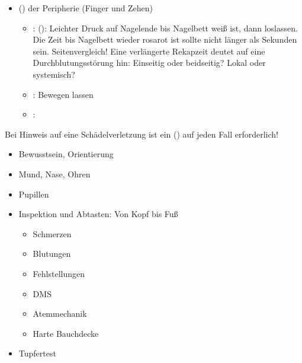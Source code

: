 {\begin{itemize}
\begin{itemize}
    \item {}: Schultern, Arme, Hände
    \item {}: vorne und seitlich 
    (Prellmarken?
    Atemmechanik? 
    Hautemphysem? 
    Gegen leichten Druck einatmen lassen)
    \item {}: in 4 Quadranten (Prellmarken?
    Abwehrspannung/harte Bauchdecke?),
    \item {}: von der Seite andrücken, schmerzhaft?
    \item {}:  Tast-, Klopfschmerz?
    
    \item {}: 
    Beine (sichtbare Verletzungen?), 
    Füße (Schuhe und Socken ausziehen)
  \end{itemize}
  \item {} () der Peripherie (Finger und Zehen) \label{topic:dms}
  \begin{itemize}
    \item {}: 
     ():
    Leichter Druck auf Nagelende bis Nagelbett weiß ist,
    dann loslassen. 
    Die Zeit bis Nagelbett wieder rosarot ist sollte
    nicht länger als  Sekunden sein.
    Seitenvergleich! 
    Eine verlängerte Rekapzeit deutet auf
    eine Durchblutungsstörung hin: 
    Einseitig oder beidseitig? 
    Lokal oder systemisch?
    \item {}: Bewegen lassen
    \item {}: 
  \end{itemize}
\end{itemize}
Bei Hinweis auf eine Schädelverletzung ist ein
 () auf jeden
Fall erforderlich! 
}{%
\begin{itemize}
  \item Bewusstsein, Orientierung
  \item Mund, Nase, Ohren
  \item Pupillen
  \item Inspektion und Abtasten: Von Kopf bis Fuß
  \begin{itemize}
    \item Schmerzen
    \item Blutungen
    \item Fehlstellungen
    \item DMS
    \item Atemmechanik
    \item Harte Bauchdecke
  \end{itemize} 
  \item Tupfertest
\end{itemize}

}
